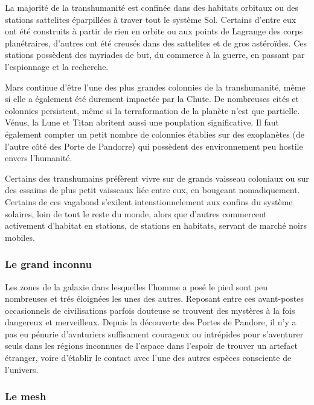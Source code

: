 La majorité de la transhumanité est confinée dans des habitats orbitaux ou des stations sattelites éparpillées à traver tout le système Sol. Certains d'entre eux ont été construits à partir de rien en orbite ou aux points de Lagrange des corps planétraires, d'autres ont été creusés dans des sattelites et de gros astéroïdes. Ces stations possèdent des myriades de but, du commerce à la guerre, en passant par l'espionnage et la recherche. 

Mars continue d'être l'une des plus grandes colonnies de la transhumanité, même si elle a également été durement impactée par la Chute. De nombreuses cités et colonnies persistent, même si la terraformation de la planète n'est que partielle. Vénus, la Lune et Titan abritent aussi une pouplation significative. Il faut également compter un petit nombre de colonnies établies sur des exoplanètes (de l'autre côté des Porte de Pandorre) qui possèdent des environnement peu hostile envers l'humanité. 

Certains des transhumains préfèrent vivre sur de grands vaisseau coloniaux ou sur des essaims de plus petit vaisseaux liée entre eux, en bougeant nomadiquement. Certains de ces vagabond s'exilent intenstionnelement aux confins du système solaires, loin de tout le reste du monde, alors que d'autres commercent activement d'habitat en stations, de stations en habitats, servant de marché noirs mobiles. 



\subsubsection{Le grand inconnu} \label{sec:great-unknown} 

Les zones de la galaxie dans lesquelles l'homme a posé le pied sont peu nombreuses et trés éloignées les unes des autres. Reposant entre ces avant-postes occasionnels de civilisations parfois douteuse se trouvent des mystères à la fois dangereux et merveilleux. Depuis la découverte des Portes de Pandore, il n'y a pas eu pénurie d'avnturiers suffisament courageux ou intrépides pour s'aventurer seuls dans les régions inconnues de l'espace dans l'espoir de trouver un artefact étranger, voire d'établir le contact avec l'une des autres espèces consciente de l'univers. 



\subsubsection{Le mesh} \label{sec:mesh} 

